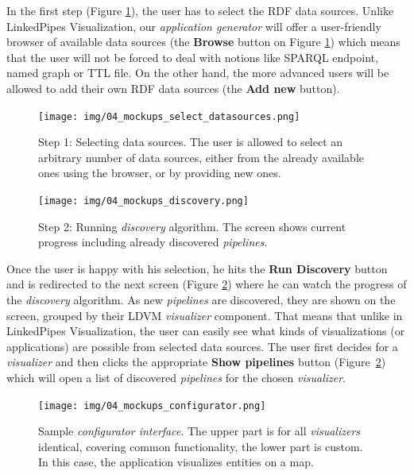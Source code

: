In the first step (Figure \ref{fig:mockups_select_datasources}), the user has to select the RDF data sources. Unlike LinkedPipes Visualization, our \emph{application generator} will offer a user-friendly browser of available data sources (the \textbf{Browse} button on Figure \ref{fig:mockups_select_datasources}) which means that the user will not be forced to deal with notions like SPARQL endpoint, named graph or TTL file. On the other hand, the more advanced users will be allowed to add their own RDF data sources (the \textbf{Add new} button).
\begin{figure}
	\centering
	\texttt{[image: img/04\_mockups\_select\_datasources.png]}
	\caption{Step 1: Selecting data sources. The user is allowed to select an arbitrary number of data sources, either from the already available ones using the browser, or by providing new ones.} 
	\label{fig:mockups_select_datasources}
\end{figure}
\begin{figure}
	\centering
	\texttt{[image: img/04\_mockups\_discovery.png]}
	\caption{Step 2: Running \emph{discovery} algorithm. The screen shows current progress including already discovered \emph{pipelines}.} 
	\label{fig:mockups_discovery}
\end{figure}

Once the user is happy with his selection, he hits the \textbf{Run Discovery} button and is redirected to the next screen (Figure \ref{fig:mockups_discovery}) where he can watch the progress of the \emph{discovery} algorithm. As new \emph{pipelines} are discovered, they are shown on the screen, grouped by their LDVM \emph{visualizer} component. That means that unlike in LinkedPipes Visualization, the user can easily see what kinds of visualizations (or applications) are possible from selected data sources. The user first decides for a \emph{visualizer} and then clicks the appropriate \textbf{Show pipelines} button (Figure~\ref{fig:mockups_discovery}) which will open a list of discovered \emph{pipelines} for the chosen \emph{visualizer}.

\begin{figure}
	\centering
	\texttt{[image: img/04\_mockups\_configurator.png]}
	\caption{Sample \emph{configurator interface}. The upper part is for all \emph{visualizers} identical, covering common functionality, the lower part is custom. In this case, the application visualizes entities on a map.} 
	\label{fig:mockups_configurator}
\end{figure}


